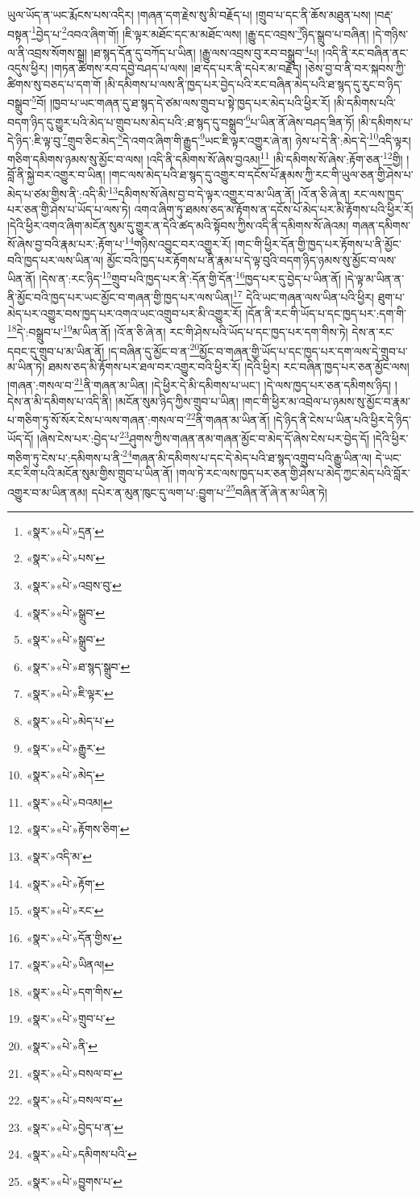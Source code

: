 ཡུལ་ཡོད་ན་ཡང་རྨོངས་པས་འདིར། །གཞན་དག་རྗེས་སུ་མི་བརྗོད་པ། །གྲུབ་པ་དང་ནི་ཆོས་མཐུན་པས། །བརྡ་བསྟན་\footnote{«སྣར་»«པེ་»དྲན་}བྱེད་པ་\footnote{«སྣར་»«པེ་»པས་}འབའ་ཞིག་གོ། །ཇི་ལྟར་མཐོང་དང་མ་མཐོང་ལས། །རྒྱུ་དང་འབྲས་\footnote{«སྣར་»«པེ་»འབྲས་བུ་}ཉིད་སྒྲུབ་པ་བཞིན། །དེ་གཉིས་ལ་ནི་འབྲས་སོགས་སྒྲ། །ཐ་སྙད་དོན་དུ་བཀོད་པ་ཡིན། །རྒྱུ་ལས་འབྲས་བུ་རབ་བསྒྲུབ་\footnote{«སྣར་»«པེ་»སྒྲུབ་}པ། །འདི་ནི་རང་བཞིན་ནང་འདུས་ཕྱིར། །གཏན་ཚིགས་རབ་དབྱེ་བཤད་པ་ལས། །ཐ་དད་པར་ནི་དཔེར་མ་བརྗོད། །ཅེས་བྱ་བ་ནི་བར་སྐབས་ཀྱི་ཚིགས་སུ་བཅད་པ་དག་གོ །མི་དམིགས་པ་ལས་ནི་ཁྱད་པར་བྱེད་པའི་རང་བཞིན་མེད་པའི་ཐ་སྙད་དུ་རུང་བ་ཉིད་བསྒྲུབ་\footnote{«སྣར་»«པེ་»སྒྲུབ་}བོ། །ཁྱབ་པ་ཡང་གཞན་དུ་ཐ་སྙད་དེ་ཙམ་ལས་གྲུབ་པ་སྟེ་ཁྱད་པར་མེད་པའི་ཕྱིར་རོ། །མི་དམིགས་པའི་བདག་ཉིད་དུ་གྱུར་པའི་མེད་པ་གྲུབ་པས་མེད་པའི་:ཐ་སྙད་དུ་བསྒྲུབ་\footnote{«སྣར་»«པེ་»ཐ་སྙད་སྒྲུབ་}པ་ཡིན་ནོ་ཞེས་བཤད་ཟིན་ཏོ། །མི་དམིགས་པ་དེ་ཉིད་:ཇི་ལྟ་བུ་\footnote{«སྣར་»«པེ་»ཇི་ལྟར་}གྲུབ་ཅིང་མེད་\footnote{«སྣར་»«པེ་»མེད་པ་}དེ་འགའ་ཞིག་གི་རྒྱུད་\footnote{«སྣར་»«པེ་»རྒྱུར་}ཡང་ཇི་ལྟར་འགྱུར་ཞེ་ན། ཉེས་པ་དེ་ནི་:མེད་དེ་\footnote{«སྣར་»«པེ་»མེད་}འདི་ལྟར། གཅིག་དམིགས་ཉམས་སུ་མྱོང་བ་ལས། །འདི་ནི་དམིགས་སོ་ཞེས་བྱའམ།\footnote{«སྣར་»«པེ་»བའམ།} །མི་དམིགས་སོ་ཞེས་:རྟོག་ཅན་\footnote{«སྣར་»«པེ་»རྟོགས་ཅིག་}གྱི། །བློ་ནི་སྐྱེ་བར་འགྱུར་བ་ཡིན། །གང་ལས་མེད་པའི་ཐ་སྙད་དུ་འགྱུར་བ་དངོས་པོ་རྣམས་ཀྱི་རང་གི་ཡུལ་ཅན་གྱི་ཤེས་པ་མེད་པ་ཙམ་གྱིས་ནི་:འདི་མི་\footnote{«སྣར་»འདི་མ་}དམིགས་སོ་ཞེས་བྱ་བ་དེ་ལྟར་འགྱུར་བ་མ་ཡིན་ནོ། །འོ་ན་ཅི་ཞེ་ན། རང་ལས་ཁྱད་པར་ཅན་གྱི་ཤེས་པ་ཡོད་པ་ལས་ཏེ། འགའ་ཞིག་ཏུ་ཐམས་ཅད་མ་རྟོགས་ན་དངོས་པོ་མེད་པར་མི་རྟོགས་པའི་ཕྱིར་རོ། །དེའི་ཕྱིར་འགའ་ཞིག་མངོན་སུམ་དུ་གྱུར་ན་དེའི་ཚད་མའི་སྟོབས་ཀྱིས་འདི་ནི་དམིགས་སོ་ཞེའམ། གཞན་དམིགས་སོ་ཞེས་བྱ་བའི་རྣམ་པར་:རྟོག་པ་\footnote{«སྣར་»«པེ་»རྟོག་}གཉིས་འབྱུང་བར་འགྱུར་རོ། །གང་གི་ཕྱིར་དོན་གྱི་ཁྱད་པར་རྟོགས་པ་ནི་མྱོང་བའི་ཁྱད་པར་ལས་ཡིན་ལ། མྱོང་བའི་ཁྱད་པར་རྟོགས་པ་ནི་རྣམ་པ་དེ་ལྟ་བུའི་བདག་ཉིད་ཉམས་སུ་མྱོང་བ་ལས་ཡིན་ནོ། །དེས་ན་:རང་ཉིད་\footnote{«སྣར་»«པེ་»རང་}གྲུབ་པའི་ཁྱད་པར་ནི་:དོན་གྱི་དོན་\footnote{«སྣར་»«པེ་»དོན་གྱིས་}ཁྱད་པར་དུ་བྱེད་པ་ཡིན་ནོ། །དེ་ལྟ་མ་ཡིན་ན་ནི་མྱོང་བའི་ཁྱད་པར་ཡང་མྱོང་བ་གཞན་གྱི་ཁྱད་པར་ལས་ཡིན།\footnote{«སྣར་»«པེ་»ཡིནལ།} དེའི་ཡང་གཞན་ལས་ཡིན་པའི་ཕྱིར། ཐུག་པ་མེད་པར་འགྱུར་བས་ཁྱད་པར་འགའ་ཡང་འགྲུབ་པར་མི་འགྱུར་རོ། །དོན་ནི་རང་གི་ཡོད་པ་དང་ཁྱད་པར་:དག་གི་\footnote{«སྣར་»«པེ་»དག་གིས་}དེ་:བསྒྲུབ་པ་\footnote{«སྣར་»«པེ་»གྲུབ་པ་}མ་ཡིན་ནོ། །འོ་ན་ཅི་ཞེ་ན། རང་གི་ཤེས་པའི་ཡོད་པ་དང་ཁྱད་པར་དག་གིས་ཏེ། དེས་ན་རང་དབང་དུ་གྲུབ་པ་མ་ཡིན་ནོ། །ད་བཞིན་དུ་མྱོང་བ་ན་\footnote{«སྣར་»«པེ་»ནི་}མྱོང་བ་གཞན་གྱི་ཡོད་པ་དང་ཁྱད་པར་དག་ལས་དེ་གྲུབ་པ་མ་ཡིན་ཏེ། ཐམས་ཅད་མི་རྟོགས་པར་ཐལ་བར་འགྱུར་བའི་ཕྱིར་རོ། །དེའི་ཕྱིར། རང་བཞིན་ཁྱད་པར་ཅན་མྱོང་ལས། །གཞན་:གསལ་བ་\footnote{«སྣར་»«པེ་»བསལ་བ་}ནི་གཞན་མ་ཡིན། །དེ་ཕྱིར་དེ་མི་དམིགས་པ་ཡང་། །དེ་ལས་ཁྱད་པར་ཅན་དམིགས་ཉིད། །དེས་ན་མི་དམིགས་པ་འདི་ནི། །མངོན་སུམ་ཉིད་ཀྱིས་གྲུབ་པ་ཡིན། །གང་གི་ཕྱིར་མ་འབྲེལ་པ་ཉམས་སུ་མྱོང་བ་རྣམ་པ་གཅིག་ཏུ་སོ་སོར་ངེས་པ་ལས་གཞན་:གསལ་བ་\footnote{«སྣར་»«པེ་»བསལ་བ་}ནི་གཞན་མ་ཡིན་ནོ། །དེ་ཉིད་ནི་ངེས་པ་ཡིན་པའི་ཕྱིར་དེ་ཉིད་ཡོད་དོ། །ཞེས་ངེས་པར་:བྱེད་པ་\footnote{«སྣར་»«པེ་»བྱེད་པ་ན་}ཤུགས་ཀྱིས་གཞན་ནམ་གཞན་མྱོང་བ་མེད་དོ་ཞེས་ངེས་པར་བྱེད་དོ། །དེའི་ཕྱིར་གཅིག་ཏུ་ངེས་པ་:དམིགས་པ་ནི་\footnote{«སྣར་»«པེ་»དམིགས་པའི་}གཞན་མི་དམིགས་པ་དང་དེ་མེད་པའི་ཐ་སྙད་འགྲུབ་པའི་རྒྱུ་ཡིན་ལ། དེ་ཡང་རང་རིག་པའི་མངོན་སུམ་གྱིས་གྲུབ་པ་ཡིན་ནོ། །གལ་ཏེ་རང་ལས་ཁྱད་པར་ཅན་གྱི་ཤེས་པ་མེད་ཀྱང་མེད་པའི་བློར་འགྱུར་བ་མ་ཡིན་ནམ། དཔེར་ན་མུན་ཁུང་དུ་ལག་པ་:བྱུག་པ་\footnote{«སྣར་»«པེ་»བྱུགས་པ་}བཞིན་ནོ་ཞེ་ན་མ་ཡིན་ཏེ། 